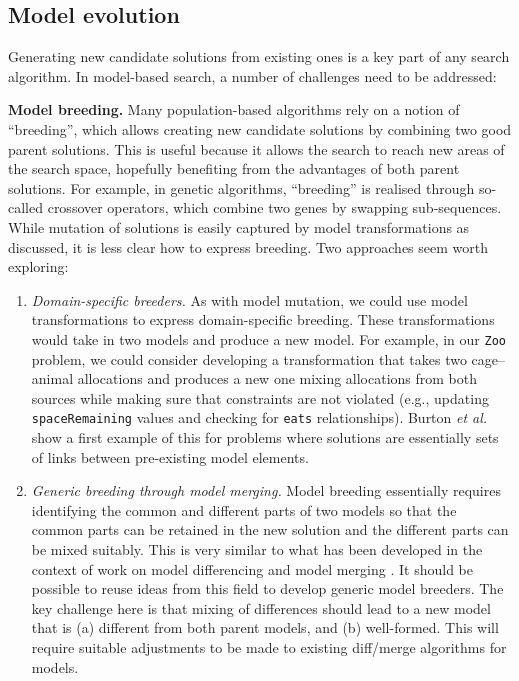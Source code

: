 	\subsection{Model evolution}
	
		Generating new candidate solutions from existing ones is a key part of any search algorithm. In model-based search, a number of challenges need to be
		addressed:
		
		\textbf{Model breeding.}
		  Many population-based algorithms rely on a notion of ``breeding'', which allows creating new candidate solutions by combining two good parent solutions. This
			is useful because it allows the search to reach new areas of the search space, hopefully benefiting from the advantages of both parent solutions. For
			example, in genetic algorithms, ``breeding'' is realised through so-called crossover operators, which combine two genes by swapping sub-sequences. While
			mutation of solutions is easily captured by model transformations as discussed, it is less clear how to express breeding. Two approaches seem worth exploring:
			
			\begin{enumerate}
			  \item \emph{Domain-specific breeders.} As with model mutation, we could use model transformations to express domain-specific breeding. These
				      transformations would take in two models and produce a new model. For example, in our \texttt{Zoo} problem, we could consider developing a
							transformation that takes two cage--animal allocations and produces a new one mixing allocations from both sources while making sure that constraints
							are not violated (e.g., updating \texttt{spaceRemaining} values and checking for \texttt{eats} relationships). Burton \emph{et al.} \cite{Burton+12}
							show a first example of this for problems where solutions are essentially sets of links between pre-existing model elements.
				\item \emph{Generic breeding through model merging.} Model breeding essentially requires identifying the common and different parts of two models so that
				      the common parts can be retained in the new solution and the different parts can be mixed suitably. This is very similar to what has been developed
							in the context of work on model differencing and model merging \cite{Kolovos09,Kolovos+09b,Maoz+10,Langer+14}. It should be possible to reuse ideas
							from this field to develop generic model breeders. The key challenge here is that mixing of differences should lead to a new model that is (a)
							different from both parent models, and (b) well-formed. This will require suitable adjustments to be made to existing diff/merge algorithms for
							models.
			\end{enumerate}
			
